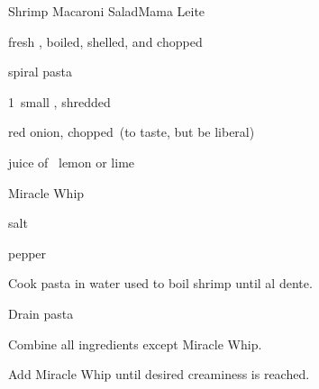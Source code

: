 \begin{recipe}{Shrimp Macaroni Salad}{Mama Leite}{}

\begin{ingredients}
\item \lbs{\half} fresh , boiled, shelled, and chopped
\item {} spiral pasta
\item 1~small , shredded
\item red onion, chopped~(to taste, but be liberal)
\item juice of \half{}~lemon or lime
\item Miracle Whip
\item salt
\item pepper
\end{ingredients}

\begin{directions}
\item Cook pasta in water used to boil shrimp until al dente.
\item Drain pasta
\item Combine all ingredients except Miracle Whip.
\item Add Miracle Whip until desired creaminess is reached.
\end{directions}

\end{recipe}
